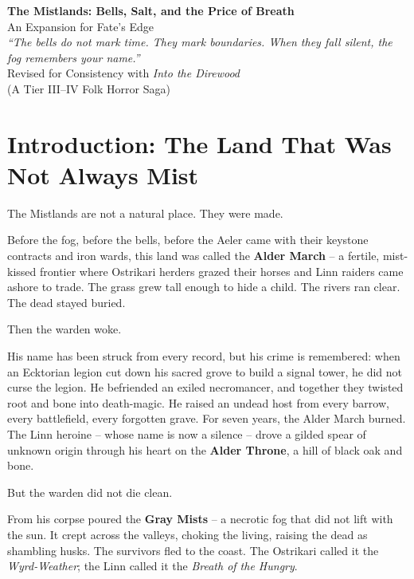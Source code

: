 \documentclass[12pt]{article}
\begin{document}


\thispagestyle{empty}

\begin{center}
    {\LARGE \bfseries The Mistlands: Bells, Salt, and the Price of Breath}\\[0.5em]
    {\large An Expansion for Fate's Edge}\\[1em]
    {\itshape ``The bells do not mark time. They mark boundaries. When they fall silent, the fog remembers your name.''}\\[2em]
    {\large Revised for Consistency with \textit{Into the Direwood}}\\[0.5em]
    {\normalsize (A Tier III--IV Folk Horror Saga)}\\[1em]
\end{center}

\section*{Introduction: The Land That Was Not Always Mist}
The Mistlands are not a natural place. They were made.

Before the fog, before the bells, before the Aeler came with their keystone contracts and iron wards, this land was called the \textbf{Alder March} -- a fertile, mist-kissed frontier where Ostrikari herders grazed their horses and Linn raiders came ashore to trade. The grass grew tall enough to hide a child. The rivers ran clear. The dead stayed buried.

Then the warden woke.

His name has been struck from every record, but his crime is remembered: when an Ecktorian legion cut down his sacred grove to build a signal tower, he did not curse the legion. He befriended an exiled necromancer, and together they twisted root and bone into death-magic. He raised an undead host from every barrow, every battlefield, every forgotten grave. For seven years, the Alder March burned. The Linn heroine -- whose name is now a silence -- drove a gilded spear of unknown origin through his heart on the \textbf{Alder Throne}, a hill of black oak and bone.

But the warden did not die clean.

From his corpse poured the \textbf{Gray Mists} -- a necrotic fog that did not lift with the sun. It crept across the valleys, choking the living, raising the dead as shambling husks. The survivors fled to the coast. The Ostrikari called it the \textit{Wyrd-Weather}; the Linn called it the \textit{Breath of the Hungry}.
\end{document}
